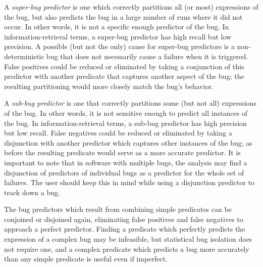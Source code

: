 A \emph{super-bug predictor} is one which correctly partitions all (or most) expressions of the bug, but also predicts the bug in a large number of runs where it did not occur.  In other words, it is not a specific enough predictor of the bug.  In information-retrieval terms, a super-bug predictor has high recall but low precision.  A possible (but not the only) cause for super-bug predictors is a non-deterministic bug that does not necessarily cause a failure when it is triggered.  False positives could be reduced or eliminated by taking a conjunction of this predictor with another predicate that captures another aspect of the bug; the resulting partitioning would more closely match the bug's behavior.

A \emph{sub-bug predictor} is one that correctly partitions some (but not all) expressions of the bug.  In other words, it is not sensitive enough to predict all instances of the bug.  In information-retrieval terms, a sub-bug predictor has high precision but low recall.  False negatives could be reduced or eliminated by taking a disjunction with another predictor which captures other instances of the bug; as before the resulting predicate would serve as a more accurate predictor.  It is important to note that in software with multiple bugs, the analysis may find a disjunction of predictors of individual bugs as a predictor for the whole set of failures.  The user should keep this in mind while using a disjunction predictor to track down a bug.

The bug predictors which result from combining simple predicates can be conjoined or disjoined again, eliminating false positives and false negatives to approach a perfect predictor.  Finding a predicate which perfectly predicts the expression of a complex bug may be infeasible, but statistical bug isolation does not require one, and a complex predicate which predicts a bug more accurately than any simple predicate is useful even if imperfect.

